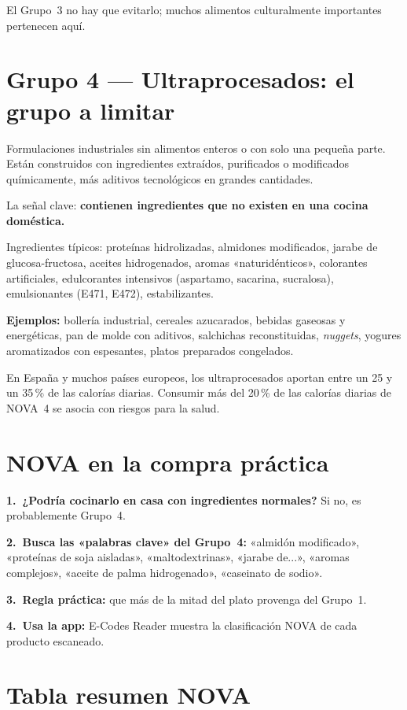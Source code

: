 \documentclass[a5paper,12pt,oneside,openany]{book}
\newcommand{\boxrojo}[2]{%
  \begin{tcolorbox}[cajabase,
    colback=rojo!8!white, colframe=rojo, title={#1}]
  #2\end{tcolorbox}}
\begin{document}
El Grupo~3 no hay que evitarlo; muchos alimentos culturalmente importantes
pertenecen aquí.

\section{Grupo 4 --- Ultraprocesados: el grupo a limitar}

Formulaciones industriales sin alimentos enteros o con solo una pequeña parte.
Están construidos con ingredientes extraídos, purificados o modificados
químicamente, más aditivos tecnológicos en grandes cantidades.

La señal clave: \textbf{contienen ingredientes que no existen en una cocina
doméstica.}

Ingredientes típicos: proteínas hidrolizadas, almidones modificados, jarabe de
glucosa-fructosa, aceites hidrogenados, aromas «naturidénticos», colorantes
artificiales, edulcorantes intensivos (aspartamo, sacarina, sucralosa),
emulsionantes (E471, E472), estabilizantes.

\textbf{Ejemplos:} bollería industrial, cereales azucarados, bebidas gaseosas
y energéticas, pan de molde con aditivos, salchichas reconstituidas, \textit{nuggets},
yogures aromatizados con espesantes, platos preparados congelados.

\boxrojo{Dato relevante}{En España y muchos países europeos, los ultraprocesados
aportan entre un 25 y un 35\,\% de las calorías diarias. Consumir más del 20\,\%
de las calorías diarias de NOVA~4 se asocia con riesgos para la salud.}

\section{NOVA en la compra práctica}

\textbf{1.~¿Podría cocinarlo en casa con ingredientes normales?} Si no, es
probablemente Grupo~4.

\textbf{2.~Busca las «palabras clave» del Grupo~4:} «almidón modificado»,
«proteínas de soja aisladas», «maltodextrinas», «jarabe de...», «aromas
complejos», «aceite de palma hidrogenado», «caseinato de sodio».

\textbf{3.~Regla práctica:} que más de la mitad del plato provenga del Grupo~1.

\textbf{4.~Usa la app:} E-Codes Reader muestra la clasificación NOVA de cada
producto escaneado.

\section{Tabla resumen NOVA}
\end{document}
